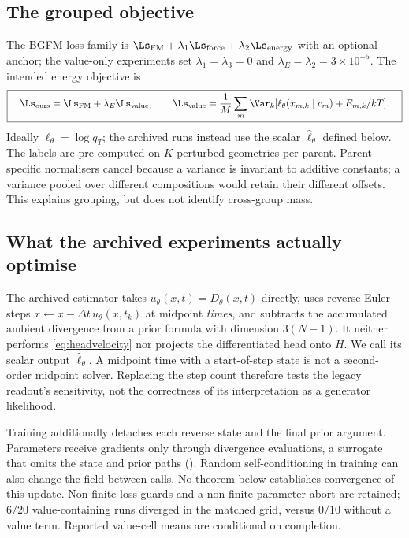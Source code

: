 \subsection{The grouped objective}
\label{sec:method:obj}
The BGFM loss family is $\Ls_{\rm FM}+\lambda_1\Ls_{\rm force}+\lambda_2\Ls_{\rm energy}$
with an optional anchor; the value-only experiments set $\lambda_1=\lambda_3=0$ and
$\lambda_E=\lambda_2=3\times10^{-5}$. The intended energy objective is
\begin{equation}
 \boxed{\quad\Ls_{\rm ours}=\Ls_{\rm FM}+\lambda_E\Ls_{\rm value},\qquad
 \Ls_{\rm value}=\frac1M\sum_m\Var_k[\ell_\theta(x_{m,k}\mid c_m)+E_{m,k}/kT].\quad}
 \label{eq:lvalue}
\end{equation}
Ideally $\ell_\theta=\log q_T$; the archived runs instead use the scalar
$\widehat\ell_\theta$ defined below. The labels are pre-computed on $K$ perturbed geometries per
parent. Parent-specific normalisers cancel because a variance is invariant to additive constants;
a variance pooled over different compositions would retain their different offsets. This explains
grouping, but does not identify cross-group mass.

\subsection{What the archived experiments actually optimise}
\label{sec:method:cancel}
\label{sec:method:impl}
The archived estimator takes $u_\theta(x,t)=D_\theta(x,t)$ directly, uses reverse Euler steps
$x\leftarrow x-\Delta t\,u_\theta(x,t_k)$ at midpoint \emph{times}, and subtracts the accumulated
ambient divergence from a prior formula with dimension $3(N-1)$. It neither performs
\eqref{eq:headvelocity} nor projects the differentiated head onto $H$. We call its scalar output
$\widehat\ell_\theta$. A midpoint time with a start-of-step state is not a second-order midpoint
solver. Replacing the step count therefore tests the legacy readout's sensitivity, not the
correctness of its interpretation as a generator likelihood.

Training additionally detaches each reverse state and the final prior argument. Parameters receive
gradients only through divergence evaluations, a surrogate that omits the state and prior paths
(). Random self-conditioning in training can also change the field between
calls. No theorem below establishes convergence of this update. Non-finite-loss guards and a
non-finite-parameter abort are retained; $6/20$ value-containing runs diverged in the matched grid,
versus $0/10$ without a value term. Reported value-cell means are conditional on completion.

